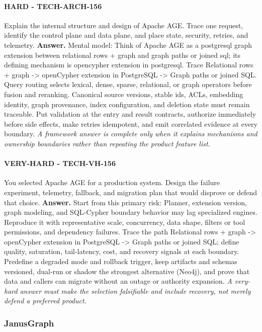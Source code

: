 \paragraph{HARD - TECH-ARCH-156} Explain the internal structure and design of Apache AGE. Trace one request, identify the control plane and data plane, and place state, security, retries, and telemetry.
\textbf{Answer.} Mental model: Think of Apache AGE as a postgresql graph extension between relational rows + graph and graph paths or joined sql; its defining mechanism is opencypher extension in postgresql. Trace Relational rows + graph -> openCypher extension in PostgreSQL -> Graph paths or joined SQL. Query routing selects lexical, dense, sparse, relational, or graph operators before fusion and reranking. Canonical source versions, stable ids, ACLs, embedding identity, graph provenance, index configuration, and deletion state must remain traceable. Put validation at the entry and result contracts, authorize immediately before side effects, make retries idempotent, and emit correlated evidence at every boundary.
\textit{A framework answer is complete only when it explains mechanisms and ownership boundaries rather than repeating the product feature list.}
\paragraph{VERY-HARD - TECH-VH-156} You selected Apache AGE for a production system. Design the failure experiment, telemetry, fallback, and migration plan that would disprove or defend that choice.
\textbf{Answer.} Start from this primary risk: Planner, extension version, graph modeling, and SQL-Cypher boundary behavior may lag specialized engines. Reproduce it with representative scale, concurrency, data shape, filters or tool permissions, and dependency failures. Trace the path Relational rows + graph -> openCypher extension in PostgreSQL -> Graph paths or joined SQL; define quality, saturation, tail-latency, cost, and recovery signals at each boundary. Predefine a degraded mode and rollback trigger, keep artifacts and schemas versioned, dual-run or shadow the strongest alternative (Neo4j), and prove that data and callers can migrate without an outage or authority expansion.
\textit{A very-hard answer must make the selection falsifiable and include recovery, not merely defend a preferred product.}
\subsubsection*{JanusGraph}
